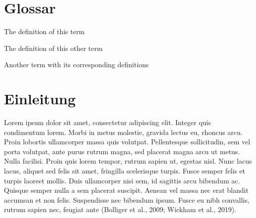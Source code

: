\documentclass[
  12pt,
  a4paperpaper,
  a4paper]{scrreprt}
\providecommand{\tightlist}{%
  \setlength{\itemsep}{0pt}\setlength{\parskip}{0pt}}\usepackage{longtable,booktabs,array}
\renewcommand*\contentsname{Inhaltsverzeichnis}
\newcommand\contentsname{Inhaltsverzeichnis}
\begin{document}
    \listoffigures




    \listoftables

\renewcommand*\contentsname{Inhaltsverzeichnis}
{
\hypersetup{linkcolor=}
\setcounter{tocdepth}{2}
\tableofcontents
}

\chapter*{}\label{section}

\markboth{}{}

\newpage{}



\chapter*{Glossar}\label{glossar}



\begin{description}
\tightlist
\item[Some term]
The definition of this term
\item[Another term]
The definition of this other term
\item[Get it?]
Another term with its corresponding definitions
\end{description}

\newpage{}



\chapter{Einleitung}\label{einleitung}

Lorem ipsum dolor sit amet, consectetur adipiscing elit. Integer quis
condimentum lorem. Morbi in metus molestie, gravida lectus eu, rhoncus
arcu. Proin lobortis ullamcorper massa quis volutpat. Pellentesque
sollicitudin, sem vel porta volutpat, ante purus rutrum magna, sed
placerat magna arcu ut metus. Nulla facilisi. Proin quis lorem tempor,
rutrum sapien ut, egestas nisl. Nunc lacus lacus, aliquet sed felis sit
amet, fringilla scelerisque turpis. Fusce semper felis et turpis laoreet
mollis. Duis ullamcorper nisi sem, id sagittis arcu bibendum ac. Quisque
semper nulla a sem placerat suscipit. Aenean vel massa nec erat blandit
accumsan et non felis. Suspendisse nec bibendum ipsum. Fusce eu nibh
convallis, rutrum sapien nec, feugiat ante (Bolliger et al., 2009;
Wickham et al., 2019).
\end{document}
